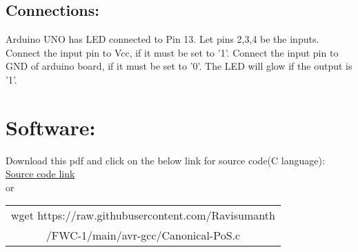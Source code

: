 \documentclass[a4paper,12pt,twocolumn]{article}
\begin{document}
\subsection{Connections:}
Arduino UNO has LED connected to Pin 13. Let pins 2,3,4 be the inputs. Connect the input pin to Vcc, if it must be set to '1'. Connect the input pin to GND of arduino board, if it must be set to '0'. The LED will glow if the output is '1'. 
\section{Software:}
Download this pdf and click on the below link for source code(C language):\\
\href{https://raw.githubusercontent.com/Ravisumanth/FWC-1/main/avr-gcc/Canonical-PoS.c}{Source code link}\\or\\ \newline \begin{tabular}{|c|}
\hline
wget https://raw.githubusercontent.com/Ravisumanth\\/FWC-1/main/avr-gcc/Canonical-PoS.c
\\ \hline
\end{tabular}
\end{document}
